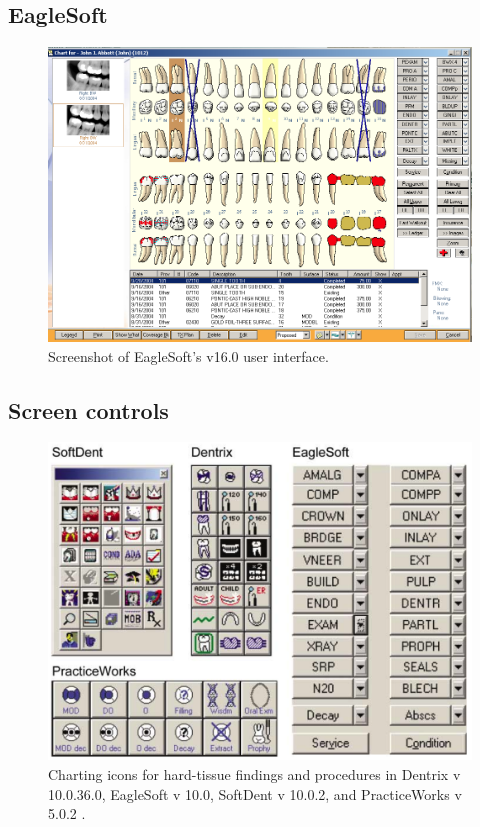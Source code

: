 \documentclass[11pt]{article}
\begin{document}
\newpage
\subsection{EagleSoft}
\label{ES}
\begin{figure}[h]
\begin{center}
\includegraphics[width=\textwidth]{esss.png}
\end{center}
\caption{Screenshot of EagleSoft's v16.0 user interface.}
\end{figure}

\newpage

\subsection{Screen controls}
\label{controls}
\begin{figure}[h]
\begin{center}
\includegraphics[width=\textwidth]{controls.png}
\end{center}
\caption{Charting icons for hard-tissue findings and procedures in Dentrix v 10.0.36.0, EagleSoft v 10.0, SoftDent v 10.0.2, and PracticeWorks v 5.0.2 \cite{Thyvalikakath2007Heuristic-evalu}.}\end{figure}
\end{document}
